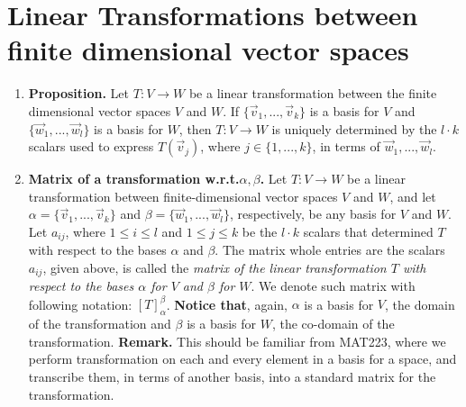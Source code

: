 \documentclass[oneside, 12pt]{book}
\newcommand{\settag}[1]{\renewcommand{\theenumi}{#1}}
\newcommand{\tbf}[1]{\textbf{#1}}
\newcommand{\tit}[1]{\textit{#1}}
\begin{document}
\section{Linear Transformations between finite dimensional vector spaces}
    \begin{enumerate}
        \settag{2.2.1}
        \item \tbf{Proposition.} Let $T:V\xrightarrow{}W$ be a linear transformation between the finite dimensional vector spaces $V$ and $W$. If $\{\vec{v}_1,...,\vec{v}_k\}$ is a basis for $V$ and $\{\vec{w}_1,...,\vec{w}_l\}$ is a basis for $W$, then $T:V\xrightarrow{}W$ is uniquely determined by the $l\cdot k$ scalars used to express $T(\vec{v}_j)$, where $j\in \{1,...,k\}$, in terms of $\vec{w}_1,...,\vec{w}_l$.
        
        \settag{2.2.6}
        \item \tbf{Matrix of a transformation w.r.t.$\alpha,\beta$.} Let $T:V\xrightarrow{}W$ be a linear transformation between finite-dimensional vector spaces $V$ and $W$, and let $\alpha = \{\vec{v}_1,...,\vec{v}_k \}$ and $\beta = \{\vec{w}_1,...,\vec{w}_l\}$, respectively, be any basis for $V$ and $W$. 
        Let $a_{ij}$, where $1\leq i \leq l$ and $1\leq j \leq k$ be the $l\cdot k$ scalars that determined $T$ with respect to the bases $\alpha$ and $\beta$. The matrix whole entries are the scalars $a_{ij}$, given above, is called the \tit{matrix of the linear transformation $T$ with respect to the bases $\alpha$ for $V$ and $\beta$ for $W$}. We denote such matrix with following notation: $\left[T\right]^\beta_\alpha$. \newline 
        \tbf{Notice that}, again, $\alpha$ is a basis for $V$, the domain of the transformation and $\beta$ is a basis for $W$, the co-domain of the transformation.
        \newline
        \tbf{Remark.} This should be familiar from MAT223, where we perform transformation on each and every element in a basis for a space, and transcribe them, in terms of another basis, into a standard matrix for the transformation.
        

\end{enumerate}
\end{document}
